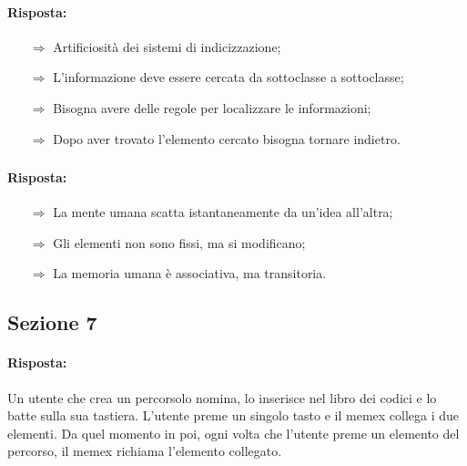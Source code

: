 \paragraph{Risposta:}

\begin{itemize}
    \item [$\Rightarrow$] Artificiosità dei sistemi di indicizzazione;
    \item [$\Rightarrow$] L'informazione deve essere cercata da sottoclasse a sottoclasse;
    \item [$\Rightarrow$] Bisogna avere delle regole per localizzare le informazioni;
    \item [$\Rightarrow$] Dopo aver trovato l'elemento cercato bisogna tornare indietro.
\end{itemize}

\subsubsection{}


\paragraph{Risposta:} 

\begin{itemize}
    \item [$\Rightarrow$] La mente umana scatta istantaneamente da un'idea all'altra;
    \item [$\Rightarrow$] Gli elementi non sono fissi, ma si modificano;
    \item [$\Rightarrow$] La memoria umana è associativa, ma transitoria.
\end{itemize}

\subsection{Sezione 7}


\paragraph{Risposta:} Un utente che crea un percorsolo nomina, lo inserisce nel libro dei codici e 
lo batte sulla sua tastiera. L'utente preme un singolo tasto e il memex collega i due elementi.
Da quel momento in poi, ogni volta che l'utente preme un elemento del percorso, il memex richiama
l'elemento collegato.

